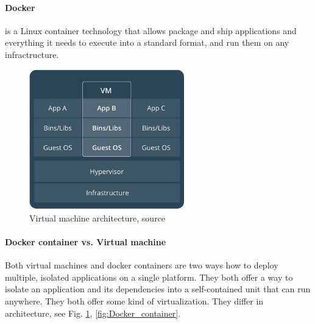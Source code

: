 \documentclass[12pt,a4paper]{article}
\begin{document}
\paragraph{Docker} is a Linux container technology that allows package and ship applications and everything it needs to execute into a standard
format, and run them on any infractructure.

\begin{figure}[h!]
\centering
\includegraphics[width=0.6\textwidth]{img/Docker_VM.png}
\caption{Virtual machine architecture, source \cite{Docker_docs}}
\label{fig:Docker_VM}
\end{figure}

\paragraph{Docker container vs. Virtual machine}
Both virtual machines and docker containers are two ways how to deploy multiple, isolated applications on a single platform. They
both offer a way to isolate an application and its dependencies into a self-contained unit that can run anywhere. They both offer
some kind of virtualization. They differ in architecture, see Fig. \ref{fig:Docker_VM}, \ref{fig:Docker_container}.
\end{document}
